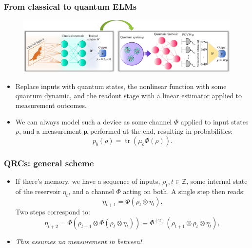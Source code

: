 \documentclass{beamer}
\begin{document}
\begin{frame}
\frametitle{From classical to quantum ELMs}

\begin{figure}
\includegraphics[width=0.9\linewidth]{figures/ELMs to QELMs.png}
\end{figure}

\begin{itemize}
    \item Replace inputs with quantum states, the nonlinear function with some quantum dynamic, and the readout stage with a linear estimator applied to measurement outcomes.
    \item We can always model such a device as some channel $\Phi$ applied to input states $\rho$, and a measurement $\boldsymbol\mu$ performed at the end, resulting in probabilities:
    \begin{equation}
        p_b(\rho) = \operatorname{tr}(\mu_b \Phi(\rho)).
    \end{equation}
\end{itemize}

\end{frame}

\begin{frame}
\frametitle{QRCs: general scheme}
\begin{itemize}
    \item If there's memory, we have a sequence of inputs, $\rho_t, t\in\mathbb{Z}$, some internal state of the reservoir $\eta_t$, and a channel $\Phi$ acting on both. A single step then reads:
    \begin{equation}
        \eta_{t+1} = \Phi(\rho_t\otimes\eta_t).
    \end{equation}
    Two steps correspond to:
    \begin{equation}
        \eta_{t+2} = \Phi(\rho_{t+1}\otimes\Phi(\rho_t\otimes\eta_t))
        \equiv \Phi^{(2)}(\rho_{t+1}\otimes\rho_t\otimes\eta_t),
    \end{equation}
    
    \item \textit{This assumes no measurement in between!}
\end{itemize}
\end{frame}
\end{document}
